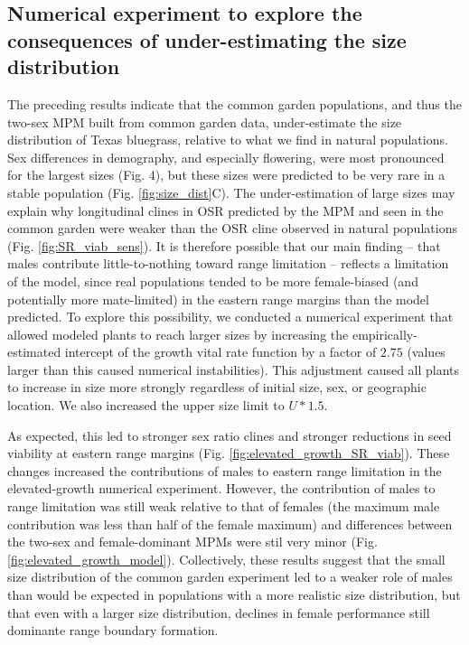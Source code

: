 \documentclass[11pt]{article}
\begin{document}
\subsection*{Numerical experiment to explore the consequences of under-estimating the size distribution}
The preceding results indicate that the common garden populations, and thus the two-sex MPM built from common garden data, under-estimate the size distribution of Texas bluegrass, relative to what we find in natural populations. 
Sex differences in demography, and especially flowering, were most pronounced for the largest sizes (Fig. 4), but these sizes were predicted to be very rare in a stable population (Fig. \ref{fig:size_dist}C). 
The under-estimation of large sizes may explain why longitudinal clines in OSR predicted by the MPM and seen in the common garden were weaker than the OSR cline observed in natural populations (Fig. \ref{fig:SR_viab_sens}). 
It is therefore possible that our main finding -- that males contribute little-to-nothing toward range limitation -- reflects a limitation of the model, since real populations tended to be more female-biased (and potentially more mate-limited) in the eastern range margins than the model predicted.
To explore this possibility, we conducted a numerical experiment that allowed modeled plants to reach larger sizes by increasing the empirically-estimated intercept of the growth vital rate function by a factor of $2.75$ (values larger than this caused numerical instabilities).
This adjustment caused all plants to increase in size more strongly regardless of initial size, sex, or geographic location. 
We also increased the upper size limit to $U*1.5$.

As expected, this led to stronger sex ratio clines and stronger reductions in seed viability at eastern range margins (Fig. \ref{fig:elevated_growth_SR_viab}). 
These changes increased the contributions of males to eastern range limitation in the elevated-growth numerical experiment.
However, the contribution of males to range limitation was still weak relative to that of females (the maximum male contribution was less than half of the female maximum) and differences between the two-sex and female-dominant MPMs were stil very minor (Fig. \ref{fig:elevated_growth_model}). 
Collectively, these results suggest that the small size distribution of the common garden experiment led to a weaker role of males than would be expected in populations with a more realistic size distribution, but that even with a larger size distribution, declines in female performance still dominante range boundary formation.
\end{document}
